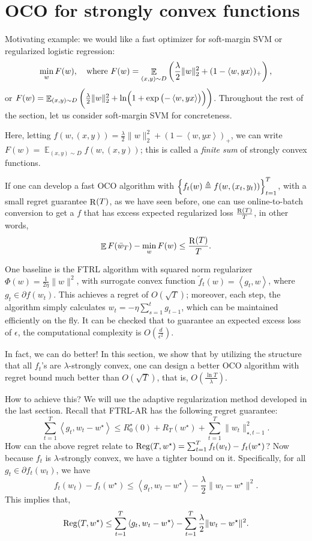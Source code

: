 \documentclass{article}
\DeclareMathOperator*{\Reg}{{\rm Reg}}
\DeclareMathOperator*{\R}{{\rm R}}
\DeclareMathOperator{\EE}{{\mathbb E}}
\newcommand{\defeq}{\triangleq}
\newcommand{\inner}[2]{\left\langle #1,#2 \right\rangle}
\begin{document}
\section{OCO for strongly convex functions}

Motivating example: we would like a fast optimizer for soft-margin SVM or regularized logistic regression:
\[ \min_{w} F(w), \quad \text{where } F(w) = \EE_{(x,y) \sim D} \del{\frac\lambda2\|w\|_2^2 + (1-\inner{w}{y x})_+}, \]
or $F(w) = \EE_{(x,y) \sim D} \del{\frac\lambda2\|w\|_2^2 + \ln(1 + \exp\del{-\inner{w}{y x}})}$. Throughout the rest of the section, let us consider soft-margin SVM for concreteness. 

Here, letting $f(w, (x,y)) = \frac\lambda2\|w\|_2^2 + (1-\inner{w}{y x})_+$, we can write
$F(w) = \EE_{(x, y) \sim D} f(w, (x,y))$; this is called a {\em finite sum} of strongly convex functions.

If one can develop a fast OCO algorithm with $\cbr{f_t(w) \defeq f(w, (x_t, y_t))}_{t=1}^T$, with a small regret guarantee $\R(T)$, as we have seen before, one can use online-to-batch conversion to get a $f$ that has excess expected regularized loss $\frac{\R(T)}{T}$, in other words,
\[ \EE F(\bar{w}_T) - \min_{w} F(w) \leq \frac{\R(T)}{T}. \]

One baseline is the FTRL algorithm with squared norm regularizer $\Phi(w) = \frac{1}{2\eta}\|w\|^2$, with surrogate convex function $\tilde{f}_t(w) = \inner{g_t}{w}$, where $g_t \in \partial f(w_t)$. This achieves a regret of $O(\sqrt{T})$; moreover, each step, the algorithm simply calculates $w_t = - \eta \sum_{s=1}^t g_{t-1}$, which can be maintained efficiently on the fly. It can be checked that to guarantee an expected excess loss of $\epsilon$, the computational complexity is $O(\frac{d}{\epsilon^2})$.

In fact, we can do better! In this section, we show that by utilizing the structure that all $f_t$'s are $\lambda$-strongly convex, one can design a better OCO algorithm with regret bound much better than $O(\sqrt{T})$, that is, $O(\frac{\ln T}{\lambda})$.

How to achieve this? We will use the adaptive regularization method developed in the last section. Recall that FTRL-AR has the following regret guarantee:
\[ \sum_{t=1}^T \inner{g_t}{w_t - w^\star} \leq R_0^\star(0) + R_T(w^\star) + \sum_{t=1}^T \| w_t \|_{\star, t-1}^2. \]
How can the above regret relate to $\Reg(T, w^\star) = \sum_{t=1}^T f_t(w_t) - f_t(w^\star)$? Now because $f_t$ is $\lambda$-strongly convex, we have a tighter bound on it. Specifically, for all $g_t \in \partial f_t(w_t)$, we have
\[ f_t(w_t) - f_t(w^\star) \leq \inner{g_t}{w_t - w^\star} - \frac\lambda 2\| w_t - w^\star \|^2. \]
This implies that,
\[ \Reg(T, w^\star) \leq \sum_{t=1}^T \inner{g_t}{w_t - w^\star} - \sum_{t=1}^T \frac\lambda 2\| w_t - w^\star \|^2. \]
\end{document}

